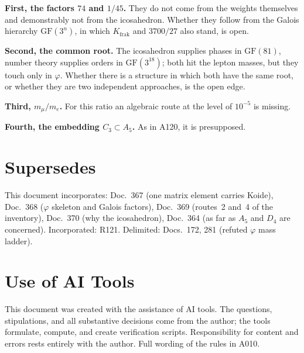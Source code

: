 \textbf{First, the factors $74$ and $1/45$.} They do not come from the weights
themselves and demonstrably not from the icosahedron. Whether they follow from
the Galois hierarchy $\mathrm{GF}(3^n)$, in which $K_\text{frak}$ and
$3700/27$ also stand, is open.

\textbf{Second, the common root.} The icosahedron supplies phases in
$\mathrm{GF}(81)$, number theory supplies orders in $\mathrm{GF}(3^{18})$; both
hit the lepton masses, but they touch only in $\varphi$. Whether there is a
structure in which both have the same root, or whether they are two
independent approaches, is the open edge.

\textbf{Third, $m_\mu/m_e$.} For this ratio an algebraic route at the level of
$10^{-5}$ is missing.

\textbf{Fourth, the embedding $C_3\subset A_5$.} As in A120, it is presupposed.

\section{Supersedes}

This document incorporates: Doc.~367 (one matrix element carries Koide),
Doc.~368 ($\varphi$ skeleton and Galois factors), Doc.~369 (routes~2 and~4 of
the inventory), Doc.~370 (why the icosahedron), Doc.~364 (as far as $A_5$ and
$D_4$ are concerned). Incorporated: R121. Delimited: Docs.~172, 281 (refuted
$\varphi$ mass ladder).

\section{Use of AI Tools}

This document was created with the assistance of AI tools. The questions,
stipulations, and all substantive decisions come from the author; the tools
formulate, compute, and create verification scripts.
Responsibility for content and errors rests entirely with the author.
Full wording of the rules in A010.
